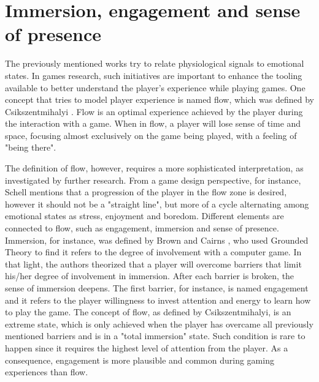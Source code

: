 \section{Immersion, engagement and sense of presence}


The previously mentioned works try to relate physiological signals to emotional states. In games research, such initiatives are important to enhance the tooling available to better understand the player's experience while playing games. One concept that tries to model player experience is named flow, which was defined by Csikszentmihalyi \parencite{csikszentmihalyi1991flow}. Flow is an optimal experience achieved by the player during the interaction with a game. When in flow, a player will lose sense of time and space, focusing almost exclusively on the game being played, with a feeling of "being there".

The definition of flow, however, requires a more sophisticated interpretation, as investigated by further research. From a game design perspective, for instance, Schell \parencite{schell2014art} mentions that a progression of the player in the flow zone is desired, however it should not be a "straight line", but more of a cycle alternating among emotional states as stress, enjoyment and boredom. Different elements are connected to flow, such as engagement, immersion and sense of presence. Immersion, for instance, was defined by Brown and Cairns \parencite{brown2004grounded}, who used Grounded Theory to find it refers to the degree of involvement with a computer game. In that light, the authors theorized that a player will overcome barriers that limit his/her degree of involvement in immersion. After each barrier is broken, the sense of immersion deepens. The first barrier, for instance, is named engagement and it refers to the player willingness  to invest attention and energy to learn how to play the game. The concept of flow, as defined by Csikszentmihalyi, is an extreme state, which is only achieved when the player has overcame all previously mentioned barriers and is in a "total immersion" state. Such condition is rare to happen since it requires the highest level of attention from the player. As a consequence, engagement is more plausible and common during gaming experiences than flow.

